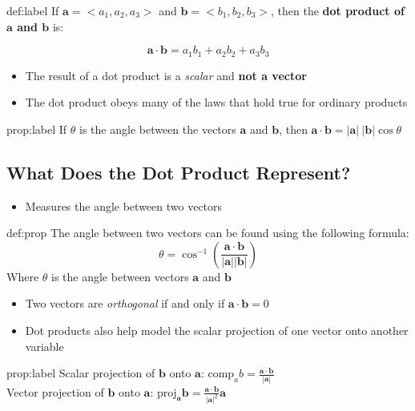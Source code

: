 \documentclass{package/notes}
\begin{document}
	\begin{definition}{def:label}
		If $\mathbf{a} = <a_1, a_2, a_3>$ and $\mathbf{b} = <b_1, b_2, b_3>$, then the \textbf{dot product of $\mathbf{a}$ and $\mathbf{b}$} is:

		$$\mathbf a \cdot \mathbf b = a_1b_1 + a_2b_2 + a_3b_3$$
	\end{definition}

	\begin{itemize}
		\item The result of a dot product is a \textit{scalar} and \textbf{not a vector}
		\item The dot product obeys many of the laws that hold true for ordinary products
	\end{itemize}

	\begin{proposition}{prop:label}
		If $\theta$ is the angle between the vectors $\mathbf a$ and $\mathbf b$, then $ \mathbf a \cdot \mathbf b = |\mathbf a|\:|\mathbf b |\cos\theta$
	\end{proposition}


\subsection{What Does the Dot Product Represent?}

	\begin{itemize}
		\item Measures the angle between two vectors
	\end{itemize}

	\begin{proposition}{def:prop}
		The angle between two vectors can be found using the following formula:
		$$\theta = \cos ^{-1}\left(\frac{\mathbf a \cdot \mathbf b}{|\mathbf a | |\mathbf b|}\right)$$
		Where $\theta$ is the angle between vectors $\mathbf{a}$ and $\mathbf{b}$
	\end{proposition}

	\begin{itemize}
		\item Two vectors are \textit{orthogonal} if and only if $\mathbf a \cdot \mathbf b = 0$ 
		\item Dot products also help model the scalar projection of one vector onto another variable
		\end{itemize}

	\begin{proposition}{prop:label}
		Scalar projection of $\mathbf b$ onto $\mathbf a$: $\text{comp}_a b = \frac{\mathbf a \cdot \mathbf b}{|\mathbf a|}$ \\
		Vector projection of $\mathbf b$ onto $\mathbf a$: $\text{proj}_{\mathbf a}\mathbf b = \frac{\mathbf a \cdot \mathbf b}{|\mathbf a|^2}\mathbf a$
	\end{proposition} %
\end{document}
